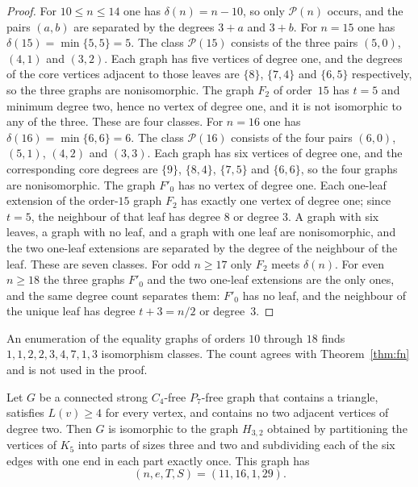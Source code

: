 \documentclass[ASNA]{USG}
\theoremstyle{WBstyletwo}
\numberwithin{equation}{section}
\begin{document}
\begin{proof}
For $10\le n\le 14$ one has $\delta(n)=n-10$, so only $\mathcal P(n)$ occurs, and the pairs $(a,b)$ are separated by the degrees $3+a$ and $3+b$. For $n=15$ one has $\delta(15)=\min\{5,5\}=5$. The class $\mathcal P(15)$ consists of the three pairs $(5,0)$, $(4,1)$ and $(3,2)$. Each graph has five vertices of degree one, and the degrees of the core vertices adjacent to those leaves are $\{8\}$, $\{7,4\}$ and $\{6,5\}$ respectively, so the three graphs are nonisomorphic. The graph $F_2$ of order~$15$ has $t=5$ and minimum degree two, hence no vertex of degree one, and it is not isomorphic to any of the three. These are four classes. For $n=16$ one has $\delta(16)=\min\{6,6\}=6$. The class $\mathcal P(16)$ consists of the four pairs $(6,0)$, $(5,1)$, $(4,2)$ and $(3,3)$. Each graph has six vertices of degree one, and the corresponding core degrees are $\{9\}$, $\{8,4\}$, $\{7,5\}$ and $\{6,6\}$, so the four graphs are nonisomorphic. The graph $F'_0$ has no vertex of degree one. Each one-leaf extension of the order-$15$ graph $F_2$ has exactly one vertex of degree one; since $t=5$, the neighbour of that leaf has degree $8$ or degree $3$. A graph with six leaves, a graph with no leaf, and a graph with one leaf are nonisomorphic, and the two one-leaf extensions are separated by the degree of the neighbour of the leaf. These are seven classes. For odd $n\ge 17$ only $F_2$ meets $\delta(n)$. For even $n\ge 18$ the three graphs $F'_0$ and the two one-leaf extensions are the only ones, and the same degree count separates them: $F'_0$ has no leaf, and the neighbour of the unique leaf has degree $t+3=n/2$ or degree~$3$.
\end{proof}


An enumeration of the equality graphs of orders $10$ through $18$ finds $1,1,2,2,3,4,7,1,3$ isomorphism classes. The count agrees with Theorem~\ref{thm:fn} and is not used in the proof.

\begin{lemma}\label{lem:finite}
Let $G$ be a connected strong $C_4$-free $P_7$-free graph that contains a triangle, satisfies $L(v)\ge 4$ for every vertex, and contains no two adjacent vertices of degree two. Then $G$ is isomorphic to the graph $H_{3,2}$ obtained by partitioning the vertices of $K_5$ into parts of sizes three and two and subdividing each of the six edges with one end in each part exactly once. This graph has
\[
(n,e,T,S)=(11,16,1,29).
\]
\end{lemma}
\end{document}

